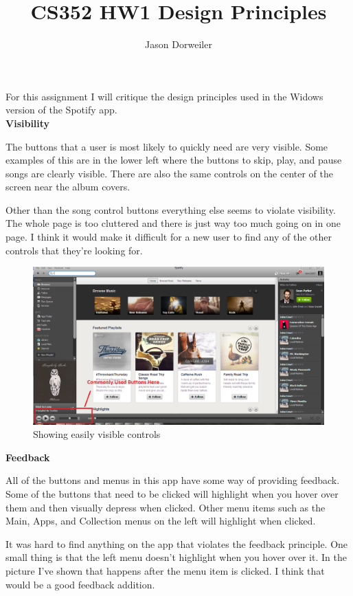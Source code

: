 \documentclass[a4paper,12pt]{article}
\begin{document}
\title{CS352 HW1 Design Principles}
\author{Jason Dorweiler}
\maketitle 

For this assignment I will critique the design principles used in the Widows version of the Spotify app. \\

\textbf{Visibility}

The buttons that a user is most likely to quickly need are very visible.  Some examples of this are in the lower left where the buttons to skip, play, and pause songs are clearly visible.  There are also the same controls on the center of the screen near the album covers.  

Other than the song control buttons everything else seems to violate visibility.  The whole page is too cluttered and there is just way too much going on in one page.  I think it would make it difficult for a new user to find any of the other controls that they're looking for. \\

\begin{figure}[h!]
\centering
\includegraphics[width=1\textwidth]{visibility}
\caption{Showing easily visible controls}
\end{figure}


\textbf{Feedback}

All of the buttons and menus in this app have some way of providing feedback.  Some of the buttons that need to be clicked will highlight when you hover over them and then visually depress when clicked.  Other menu items such as the Main, Apps, and Collection menus on the left will highlight when clicked. 

It was hard to find anything on  the app that violates the feedback principle.  One small thing is that the left menu doesn't highlight when you hover over it.  In the picture I've shown that happens after the menu item is clicked.  I think that would be a good feedback addition.
\end{document}
